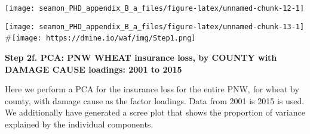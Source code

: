 \documentclass[]{article}
\newenvironment{Shaded}{\begin{snugshade}}{\end{snugshade}}
\newcommand{\CommentTok}[1]{\textcolor[rgb]{0.56,0.35,0.01}{\textit{#1}}}
\newcommand{\DataTypeTok}[1]{\textcolor[rgb]{0.13,0.29,0.53}{#1}}
\newcommand{\DecValTok}[1]{\textcolor[rgb]{0.00,0.00,0.81}{#1}}
\newcommand{\KeywordTok}[1]{\textcolor[rgb]{0.13,0.29,0.53}{\textbf{#1}}}
\newcommand{\NormalTok}[1]{#1}
\newcommand{\OperatorTok}[1]{\textcolor[rgb]{0.81,0.36,0.00}{\textbf{#1}}}
\newcommand{\StringTok}[1]{\textcolor[rgb]{0.31,0.60,0.02}{#1}}
\begin{document}
\texttt{[image: seamon\_PHD\_appendix\_B\_a\_files/figure-latex/unnamed-chunk-12-1]}

\begin{Shaded}
\end{Shaded}

\texttt{[image: seamon\_PHD\_appendix\_B\_a\_files/figure-latex/unnamed-chunk-13-1]}
\#\texttt{[image: https://dmine.io/waf/img/Step1.png]}

\textbf{Step 2f. PCA: PNW WHEAT insurance loss, by COUNTY with DAMAGE
CAUSE loadings: 2001 to 2015}

Here we perform a PCA for the insurance loss for the entire PNW, for
wheat by county, with damage cause as the factor loadings. Data from
2001 is 2015 is used. We additionally have generated a scree plot that
shows the proportion of variance explained by the individual components.
\end{document}

